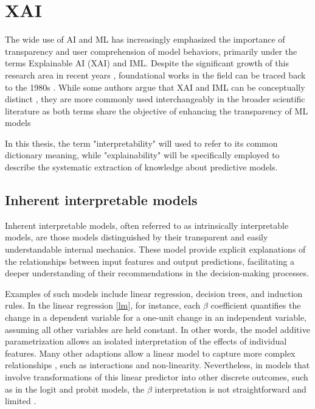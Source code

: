 \section{XAI}

The wide use of \gls{AI} and \gls{ML} has increasingly emphasized the importance of transparency and user comprehension of model behaviors, primarily under the terms Explainable AI (\gls{XAI}) and \gls{IML}. Despite the significant growth of this research area in recent years \cite{Arya2019OneTechniques}, foundational works in the field can be traced back to the 1980s \cite{Fagant1980COMPUTER-BASEDVM, Bareiss1988Protos:Apprentice}. While some authors argue that \gls{XAI} and \gls{IML} can be conceptually distinct \cite{Watson2022ConceptualLearning}, they are more commonly used interchangeably in the broader scientific literature as both terms share the objective of enhancing the transparency of \gls{ML} models \cite{Molnar2022Model-agnosticLearning}

In this thesis, the term "interpretability" will used to refer to its common dictionary meaning, while "explainability" will be specifically employed to describe the systematic extraction of knowledge about predictive models. 

\subsection{Inherent interpretable models}

Inherent interpretable models, often referred to as intrinsically interpretable models, are those models distinguished by their transparent and easily understandable internal mechanics. These model provide explicit explanations of the relationships between input features and output predictions, facilitating a deeper understanding of their recommendations in the decision-making processes. 

Examples of such models include linear regression, decision trees, and induction rules. In the linear regression \ref{lm}, for instance, each $\beta$ coefficient quantifies the change in a dependent variable for a one-unit change in an independent variable, assuming all other variables are held constant. In other words, the model additive parametrization allows an isolated interpretation of the effects of individual features. Many other adaptions allow a linear model to capture more complex relationships \cite{TrevorHastieRobertTibshirani2014AssessmentSelection}, such as interactions and non-linearity. Nevertheless, in models that involve transformations of this linear predictor into other discrete outcomes, such as in the logit and probit models, the $\beta$ interpretation is not straightforward and limited \cite{Mood2017LogisticHeterogeneity, long1997regression}. 

